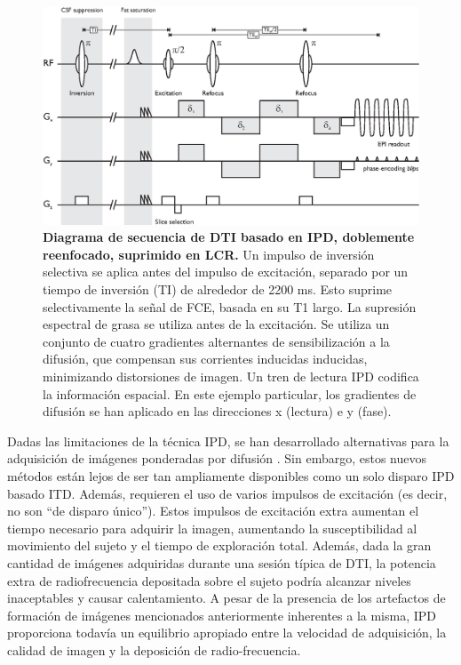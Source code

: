 \documentclass[12pt,a5,twoside]{book}
\begin{document}
\begin{figure}
	\centering
    \includegraphics [scale=0.7,center] {ReeseDTI.eps}
    \caption{\textbf{Diagrama de secuencia de DTI basado en IPD, doblemente reenfocado, suprimido en LCR.} Un impulso de inversión selectiva se aplica antes del impulso de excitación, separado por un tiempo de inversión (TI) de alrededor de 2200 ms. Esto suprime selectivamente la señal de FCE, basada en su T1 largo. La supresión espectral de grasa se utiliza antes de la excitación. Se utiliza un conjunto de cuatro gradientes alternantes de sensibilización a la difusión, que compensan sus corrientes inducidas inducidas, minimizando distorsiones de imagen. Un tren de lectura IPD codifica la información espacial. En este ejemplo particular, los gradientes de difusión se han aplicado en las direcciones x (lectura) e y (fase).}
    \label{F:ReeseDTI}
\end{figure}

Dadas las limitaciones de la técnica IPD, se han desarrollado alternativas para la adquisición de imágenes ponderadas por difusión \citep{111-116}. Sin embargo, estos nuevos métodos están lejos de ser tan ampliamente disponibles como un solo disparo IPD basado ITD. Además, requieren el uso de varios impulsos de excitación (es decir, no son ``de disparo único''). Estos impulsos de excitación extra aumentan el tiempo necesario para adquirir la imagen, aumentando la susceptibilidad al movimiento del sujeto y el tiempo de exploración total. Además, dada la gran cantidad de imágenes adquiridas durante una sesión típica de DTI, la potencia extra de radiofrecuencia depositada sobre el sujeto podría alcanzar niveles inaceptables y causar calentamiento. A pesar de la presencia de los artefactos de formación de imágenes mencionados anteriormente inherentes a la misma, IPD proporciona todavía un equilibrio apropiado entre la velocidad de adquisición, la calidad de imagen y la deposición de radio-frecuencia.
\end{document}
